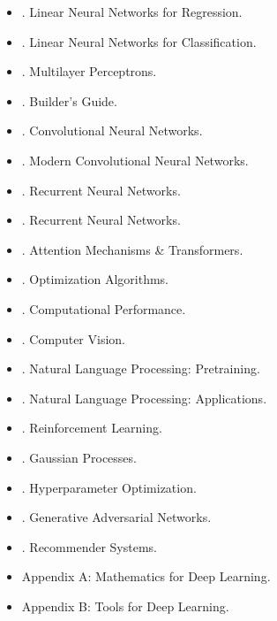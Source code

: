 \documentclass{article}
\begin{document}
\begin{enumerate}
\begin{itemize}
\begin{itemize}
\begin{itemize}
\begin{verbatim}
				\end{verbatim}
			\end{itemize}
		\end{itemize}
		\item {. Linear Neural Networks for Regression.}
		\item {. Linear Neural Networks for Classification.}
		\item {. Multilayer Perceptrons.}
		\item {. Builder's Guide.}
		\item {. Convolutional Neural Networks.}
		\item {. Modern Convolutional Neural Networks.}
		\item {. Recurrent Neural Networks.}
		\item {. Recurrent Neural Networks.}
		\item {. Attention Mechanisms \& Transformers.}
		\item {. Optimization Algorithms.}
		\item {. Computational Performance.}
		\item {. Computer Vision.}
		\item {. Natural Language Processing: Pretraining.}
		\item {. Natural Language Processing: Applications.}
		\item {. Reinforcement Learning.}
		\item {. Gaussian Processes.}
		\item {. Hyperparameter Optimization.}
		\item {. Generative Adversarial Networks.}
		\item {. Recommender Systems.}
		\item {\sf Appendix A: Mathematics for Deep Learning.}
		\item {\sf Appendix B: Tools for Deep Learning.}
	\end{itemize}	
\end{enumerate}

\end{document}
